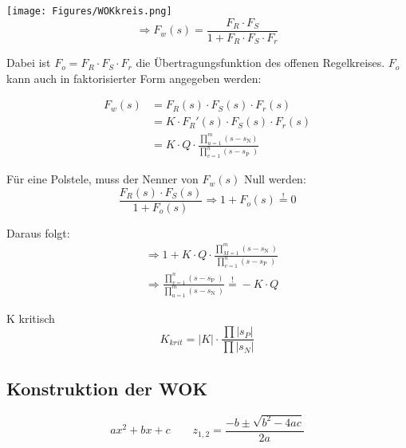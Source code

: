 \texttt{[image: Figures/WOKkreis.png]}
\[
	\Rightarrow F_w (s)= \dfrac {F_R \cdot F_S} {1+F_R \cdot F_S \cdot F_r}
\]

\begin{mdframed}[style=exercise]
	Dabei ist $F_o = F_R \cdot F_S \cdot F_r$ die Übertragungsfunktion des
	offenen Regelkreises. $F_o$ kann auch in faktorisierter Form angegeben
	werden:
\end{mdframed}

\begin{align*}
	F_w (s) & = F_R (s) \cdot F_S (s) \cdot F_r (s)
	\\ & =K \cdot F_R '(s) \cdot F_S (s) \cdot F_r (s)
	\\ & =K \cdot Q \cdot \frac{\prod_{u=1}^{m}\left(s-s_{\text {N}}\right)}{\prod_{v=1}^{n}\left(s-s_{\text {P }}\right)}
\end{align*}

Für eine Polstele, muss der Nenner von $F_w (s)$ Null werden:
\[
	\dfrac{F_R (s) \cdot F_S (s)}{1+F_o (s)} \Rightarrow 1+F_o (s) \stackrel{!}{=}0
\]

Daraus folgt:
\begin{align*}
	 & \Rightarrow 1+ K \cdot Q \cdot \frac{\prod_{M=1}^{m}\left(s-s_{\text {N }}\right)}{\prod_{v=1}^{n}\left(s-s_{\text {P }}\right)}         \\
	 & \Rightarrow \frac{\prod_{v=1}^{n}\left(s-s_{\text {P }}\right)}{\prod_{u=1}^{m}\left(s-s_{\text {N }}\right)} \stackrel{!}{=} -K \cdot Q
\end{align*}

K kritisch
\[ K_{krit} = |K| \cdot \dfrac{\prod |s_{P}|}{\prod |s_{N}|}\]

\subsection{Konstruktion der WOK}

\[ ax^2+bx+c \qquad z_{1,2} = \dfrac{-b \pm \sqrt{b^2 -4ac}}{2a}\]

